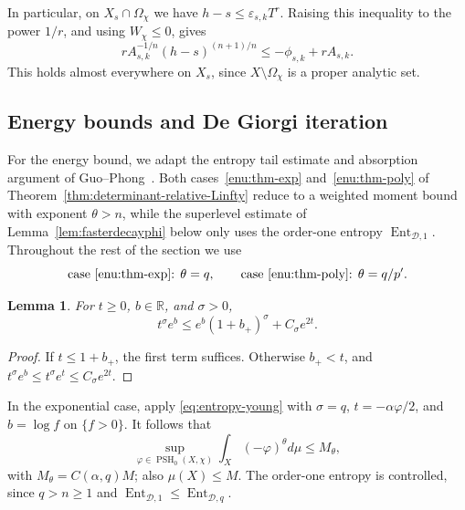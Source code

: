 \documentclass[oneside,english,letterpaper]{amsart}
\numberwithin{equation}{section}
\theoremstyle{plain}
\newtheorem{lem}[thm]{Lemma}
\theoremstyle{definition}
\theoremstyle{remark}
\begin{document}
In particular, on $X_s\cap\Omega_\chi$ we have
$h-s\leq\varepsilon_{s,k} T^r$. Raising this inequality to the power
$1/r$, and using $W_\chi\leq0$, gives
\begin{equation}
	\label{eq:pointwise-level-comparison}
	r A_{s,k}^{-1/n}(h-s)^{(n+1)/n}
	\leq-\phi_{s,k}+rA_{s,k}.
\end{equation}
This holds almost everywhere on $X_s$, since
$X\setminus\Omega_\chi$ is a proper analytic set.

\subsection{Energy bounds and De Giorgi iteration}
\label{subsec:entropy-energy-iteration}

For the energy bound, we adapt the entropy tail estimate and
absorption argument of Guo--Phong~\cite{GuoPhongEntropyEnergy}.
Both
cases~\ref{enu:thm-exp} and~\ref{enu:thm-poly} of
Theorem~\ref{thm:determinant-relative-Linfty} reduce to a weighted
moment bound with exponent $\theta>n$, while the superlevel estimate
of Lemma~\ref{lem:fasterdecayphi} below only uses the order-one
entropy $\operatorname{Ent}_{\mathcal D,1}$. Throughout the rest of the
section we use
\[
\text{case~\ref{enu:thm-exp}: }\theta=q,\qquad
\text{case~\ref{enu:thm-poly}: }\theta=q/p'.
\]
\begin{lem}
	\label{lem:generalizedyoungs}
	For $t\geq0$, $b\in\mathbb R$, and $\sigma>0$,
\begin{equation}
	\label{eq:entropy-young}
	t^\sigma e^b\leq e^b(1+b_+)^\sigma+C_\sigma e^{2t}.
\end{equation}
\end{lem}
\begin{proof}
	If $t\leq1+b_+$, the first term suffices. Otherwise $b_+<t$,
	and $t^\sigma e^b\leq t^\sigma e^t\leq C_\sigma e^{2t}$.
\end{proof}

In the exponential case, apply
\eqref{eq:entropy-young} with $\sigma=q$, $t=-\alpha\varphi/2$, and
$b=\log f$ on $\{f>0\}$. It follows that
\begin{equation}
	\label{eq:entropy-weighted-moment}
	\sup_{\varphi\in\operatorname{PSH}_0(X,\chi)}
	\int_X(-\varphi)^\theta d\mu \leq M_\theta,
\end{equation}
with $M_\theta=C(\alpha,q)M$; also $\mu(X)\leq M$. The order-one
entropy is controlled, since $q>n\geq1$ and
$\operatorname{Ent}_{\mathcal D,1}\leq\operatorname{Ent}_{\mathcal D,q}$.
\end{document}

